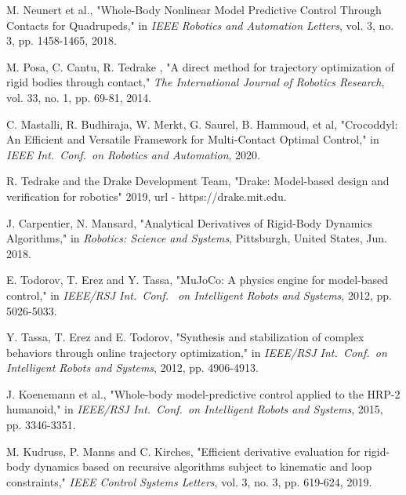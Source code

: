 \documentclass[letterpaper, 10 pt, conference]{ieeetran}  %
\begin{document}
\begin{thebibliography}{99}

M. Neunert et al., "Whole-Body Nonlinear Model Predictive Control Through Contacts for Quadrupeds," in \textit{IEEE Robotics and Automation Letters}, vol. 3, no. 3, pp. 1458-1465, 2018. %

 M. Posa, C. Cantu, R. Tedrake , "A direct method for trajectory optimization of rigid bodies through contact," \textit{The International Journal of Robotics Research}, vol. 33, no. 1, pp. 69-81, 2014. %
  
C. Mastalli, R. Budhiraja, W. Merkt, G. Saurel, B. Hammoud, et al, "Crocoddyl: An Efficient and Versatile Framework for Multi-Contact Optimal Control," in
\textit{IEEE Int.~Conf.~on Robotics and Automation}, 2020.

R. Tedrake and the Drake Development Team, "Drake: Model-based design and verification for robotics" 2019, url - https://drake.mit.edu.

J. Carpentier, N. Mansard, "Analytical Derivatives of Rigid-Body Dynamics Algorithms," in \textit{Robotics: Science and Systems},  Pittsburgh, United States, Jun. 2018.


E. Todorov, T. Erez and Y. Tassa, "MuJoCo: A physics engine for model-based control," in \textit{IEEE/RSJ Int.~Conf.~ on Intelligent Robots and Systems}, 2012, pp. 5026-5033. %



Y. Tassa, T. Erez and E. Todorov, "Synthesis and stabilization of complex behaviors through online trajectory optimization," in \textit{IEEE/RSJ Int.~Conf.~on Intelligent Robots and Systems}, 2012, pp. 4906-4913. %

J. Koenemann et al., "Whole-body model-predictive control applied to the HRP-2 humanoid," in \textit{IEEE/RSJ Int.~Conf.~on Intelligent Robots and Systems}, 2015, pp. 3346-3351. %

M. Kudruss, P. Manns and C. Kirches, "Efficient derivative evaluation for rigid-body dynamics based on recursive algorithms subject to kinematic and loop constraints," \textit{IEEE Control Systems Letters}, vol. 3, no. 3, pp. 619-624, 2019. %


\end{thebibliography}
\end{document}

